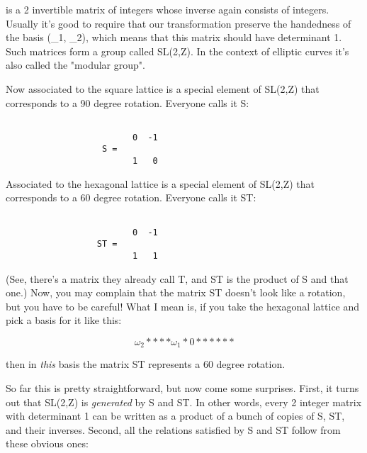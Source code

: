 is a 2 invertible matrix of integers whose inverse again consists of
integers.  Usually it's good to require
that our transformation preserve the handedness of the basis (\omega _{1},
\omega _{2}), which means that this matrix should have determinant 1.
Such matrices form a group called SL(2,Z).  In the context of elliptic
curves it's also called the "modular group".

Now associated to the square lattice is a special element of SL(2,Z)
that corresponds to a 90 degree rotation.   Everyone calls it S:


\begin{verbatim}

                         0  -1
                   S =
                         1   0
\end{verbatim}
    
Associated to the hexagonal lattice is a special element of SL(2,Z) 
that corresponds to a 60 degree rotation.   Everyone calls it ST:


\begin{verbatim}

                         0  -1
                  ST =
                         1   1
\end{verbatim}
    
(See, there's a matrix they already call T, and ST is the product of S
and that one.)  Now, you may complain that the matrix ST doesn't look
like a rotation, but you have to be careful!   What I mean is, if you
take the hexagonal lattice and pick a basis for it like this:


$$

                     \omega _{2}      
                *       *      *      *

                                 \omega _{1}
                    *      0*      *                


                *       *      *      *

$$
    
then in \emph{this} basis the matrix ST represents a 60 degree rotation.

So far this is pretty straightforward, but now come some surprises. 
First, it turns out that SL(2,Z) is \emph{generated} by S and ST.  In other
words, every 2 integer matrix with determinant 1 can be written as a
product of a bunch of copies of S, ST, and their inverses.  Second, all
the relations satisfied by S and ST follow from these obvious ones:

